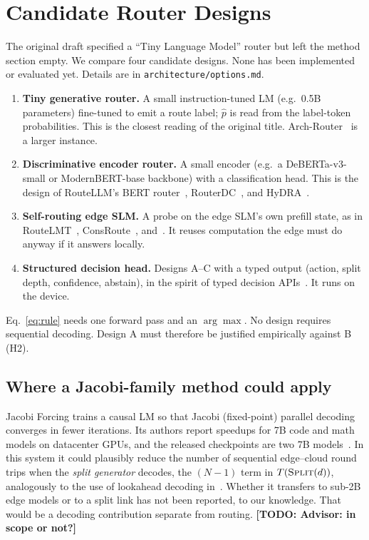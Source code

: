 \documentclass[lettersize,journal]{IEEEtran}
\newcommand{\todo}[1]{\textbf{[TODO: #1]}}
\begin{document}
\section{Candidate Router Designs}
\label{sec:design}
The original draft specified a ``Tiny Language Model'' router but left the method
section empty. We compare four candidate designs. None has been implemented or
evaluated yet. Details are in \texttt{architecture/options.md}.

\begin{enumerate}
\item[A.] \textbf{Tiny generative router.} A small instruction-tuned LM
(e.g.\ 0.5B parameters) fine-tuned to emit a route label; $\hat p$ is read from
the label-token probabilities. This is the closest reading of the original
title. Arch-Router~\cite{tran2025arch} is a larger instance.
\item[B.] \textbf{Discriminative encoder router.} A small encoder (e.g.\ a
DeBERTa-v3-small or ModernBERT-base backbone) with a classification head. This is the
design of RouteLLM's BERT router~\cite{ong2025routellm}, RouterDC~\cite{chen2024routerdc},
and HyDRA~\cite{garg2026hydra}.
\item[C.] \textbf{Self-routing edge SLM.} A probe on the edge SLM's own prefill
state, as in RouteLMT~\cite{luo2026routelmt}, ConsRoute~\cite{qiao2026consroute},
and~\cite{varshney2026llm}. It reuses computation the edge must do anyway
if it answers locally.
\item[D.] \textbf{Structured decision head.} Designs A--C with a typed output
(action, split depth, confidence, abstain), in the spirit of typed decision
APIs~\cite{typesafe2026systemone}. It runs on the device.
\end{enumerate}
Eq.~\eqref{eq:rule} needs one forward pass and an $\arg\max$. No design
requires sequential decoding. Design A must therefore be justified empirically
against B (H2).

\subsection{Where a Jacobi-family method could apply}
\label{sec:design:jacobi}
Jacobi Forcing trains a causal LM so that Jacobi (fixed-point) parallel decoding
converges in fewer iterations. Its authors report speedups for 7B code and math
models on datacenter GPUs, and the released checkpoints are two 7B
models~\cite{hu2025fast,jacobiforcing2025repo}. In this system it could
plausibly reduce the number of sequential edge--cloud round trips when the
\emph{split generator} decodes, the $(N-1)$ term in $T(\textsc{Split}(d))$,
analogously to the use of lookahead decoding in~\cite{cunningham2026privacy}.
Whether it transfers to sub-2B edge models or to a split link has not been
reported, to our knowledge. That would be a decoding contribution separate
from routing. \todo{Advisor: in scope or not?}
\end{document}
